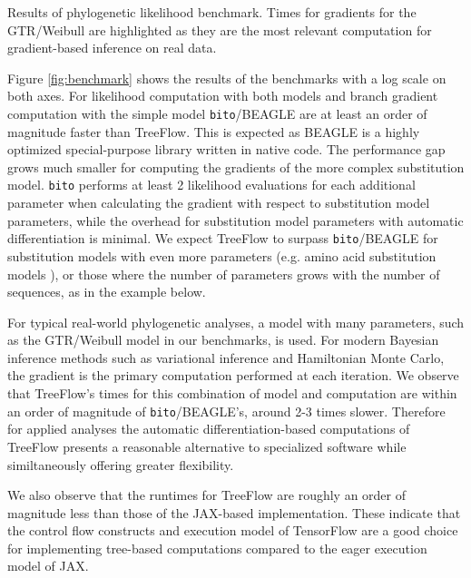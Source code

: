 \begin{table}
    \centering
    \caption{Results of phylogenetic likelihood benchmark. Times for gradients for the GTR/Weibull are highlighted as they are the most relevant computation for gradient-based inference on real data.}
    \label{tab:benchmarkfit}
\end{table}

Figure \ref{fig:benchmark} shows the results of the benchmarks with a log scale on both axes. For likelihood computation with both models and branch gradient computation with the simple model \texttt{bito}/BEAGLE are at least an order of magnitude faster than TreeFlow. This is expected as BEAGLE is a highly optimized special-purpose library written in native code. The performance gap grows much smaller for computing the gradients of the more complex substitution model. \texttt{bito} performs at least 2 likelihood evaluations for each additional parameter when calculating the gradient with respect to substitution model parameters, while the overhead for substitution model parameters with automatic differentiation is minimal. We expect TreeFlow to surpass \texttt{bito}/BEAGLE for substitution models with even more parameters (e.g. amino acid substitution models \cite{adachi1996model}), or those where the number of parameters grows with the number of sequences, as in the example below.

For typical real-world phylogenetic analyses, a model with many parameters, such as the GTR/Weibull model in our benchmarks, is used. For modern Bayesian inference methods such as variational inference and Hamiltonian Monte Carlo, the gradient is the primary computation performed at each iteration. We observe that TreeFlow's times for this combination of model and computation are within an order of magnitude of \texttt{bito}/BEAGLE's, around 2-3 times slower. Therefore for applied analyses the automatic differentiation-based computations of TreeFlow presents a reasonable alternative to specialized software while similtaneously offering greater flexibility.

We also observe that the runtimes for TreeFlow are roughly an order of magnitude less than those of the JAX-based implementation. These indicate that the control flow constructs and execution model of TensorFlow are a good choice for implementing tree-based computations compared to the eager execution model of JAX.

